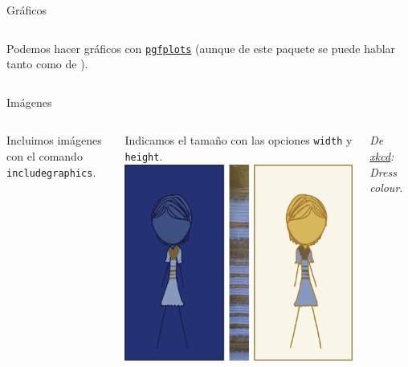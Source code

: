 \begin{frame}{Gráficos}
\hypertarget{graphs}{}
  \begin{columns}[c]

     Podemos hacer gráficos con \href{https://ctan.org/pkg/pgfplots}{\texttt{pgfplots}}
     (aunque de este paquete se puede hablar tanto como de \beamer).
  \end{columns}
\end{frame}

\begin{frame}{Imágenes}
  \begin{columns}
      Incluimos imágenes con el comando \texttt{includegraphics}.

      \espacio

      Indicamos el tamaño con las opciones \texttt{width} y \texttt{height}.
      \includegraphics[width=\textwidth]{./img/dress_color.png}
      \\
      \begin{center}
        {\footnotesize \textit{De \href{http://xkcd.com/1492}{xkcd}: Dress colour}.}
      \end{center}
  \end{columns}
\end{frame}

